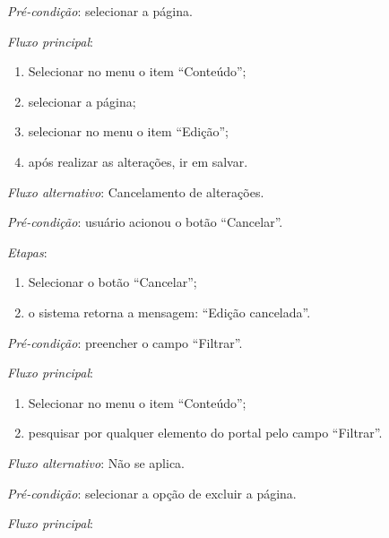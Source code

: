 \vspace{0.7cm}

\noindent \textit{Pré-condição}: selecionar a página.

\noindent \textit{Fluxo principal}:

\begin{enumerate}
    \item Selecionar no menu o item ``Conteúdo'';
    \item selecionar a página;
    \item selecionar no menu o item ``Edição'';
    \item após realizar as alterações, ir em salvar.
\end{enumerate}

\noindent \textit{Fluxo alternativo}: Cancelamento de alterações.

\noindent \textit{Pré-condição}: usuário acionou o botão ``Cancelar''.

\noindent \textit{Etapas}:

\begin{enumerate}
    \item Selecionar o botão ``Cancelar'';
    \item o sistema retorna a mensagem: ``Edição cancelada''.
\end{enumerate}


\vspace{0.7cm}

\noindent \textit{Pré-condição}: preencher o campo ``Filtrar''.

\noindent \textit{Fluxo principal}:

\begin{enumerate}
    \item Selecionar no menu o item ``Conteúdo'';
    \item pesquisar por qualquer elemento do portal pelo campo ``Filtrar''.
\end{enumerate}

\noindent \textit{Fluxo alternativo}: Não se aplica.



\vspace{0.7cm}

\noindent \textit{Pré-condição}: selecionar a opção de excluir a página.

\noindent \textit{Fluxo principal}:

